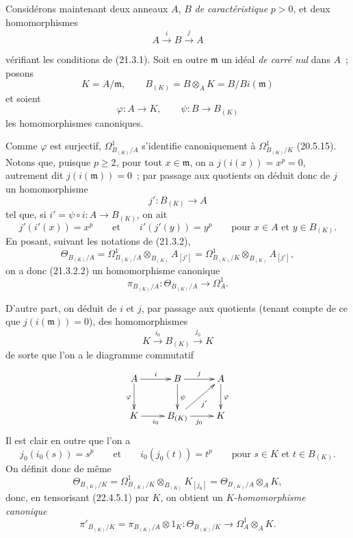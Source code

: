 \begin{env}[22.4.5]
\label{0.22.4.5-fr}
Considérons maintenant deux anneaux $A$, $B$ \emph{de caractéristique} $p>0$, et
deux homomorphismes
\[
  A\xrightarrow{i}B\xrightarrow{j}A
\]


vérifiant les conditions de (21.3.1). Soit en outre $\mathfrak m$ un idéal
\emph{de carré nul} dans $A$~; posons
\[
  K=A/\mathfrak m,\qquad
  B_{(K)}=B\otimes_AK=B/Bi(\mathfrak m)
\]
et soient
\[
  \varphi:A\longrightarrow K,\qquad
  \psi:B\longrightarrow B_{(K)}
\]
les homomorphismes canoniques.

Comme $\varphi$ est surjectif, $\Omega^1_{B_{(K)}/A}$ s'identifie
canoniquement à $\Omega^1_{B_{(K)}/K}$ (20.5.15). Notons que, puisque
$p\geqslant2$, pour tout $x\in\mathfrak m$, on a $j(i(x))=x^p=0$, autrement
dit $j(i(\mathfrak m))=0$~; par passage aux quotients on déduit donc de $j$ un
homomorphisme
\[
  j':B_{(K)}\longrightarrow A
\]
tel que, si $i'=\psi\circ i:A\longrightarrow B_{(K)}$, on ait
\[
  j'(i'(x))=x^p\qquad\text{et}\qquad i'(j'(y))=y^p
  \qquad\text{pour }x\in A\text{ et }y\in B_{(K)}.
\]
En posant, suivant les notations de (21.3.2),
\[
  \Theta_{B_{(K)}/A}
  =\Omega^1_{B_{(K)}/A}\otimes_{B_{(K)}}A_{[j']}
  =\Omega^1_{B_{(K)}/K}\otimes_{B_{(K)}}A_{[j']},
\]
on a donc (21.3.2.2) un homomorphisme canonique
\begin{equation}
\label{0.22.4.5.1-fr}
  \pi_{B_{(K)}/A}:\Theta_{B_{(K)}/A}\longrightarrow\Omega^1_A.
  \tag{22.4.5.1}
\end{equation}

D'autre part, on déduit de $i$ et $j$, par passage aux quotients (tenant compte
de ce que $j(i(\mathfrak m))=0$), des homomorphismes
\[
  K\xrightarrow{i_0}B_{(K)}\xrightarrow{j_0}K
\]
de sorte que l'on a le diagramme commutatif
\[
  \xymatrix{
    A \ar[r]^i \ar[d]_\varphi & B \ar[r]^j \ar[d]^\psi & A \ar[d]^\varphi \\
    K \ar[r]_{i_0} & B_{(K)} \ar[r]_{j_0} \ar[ur]_{j'} & K
  }
\]
Il est clair en outre que l'on a
\[
  j_0(i_0(s))=s^p\qquad\text{et}\qquad i_0(j_0(t))=t^p
  \qquad\text{pour }s\in K\text{ et }t\in B_{(K)}.
\]
On définit donc de même
\[
  \Theta_{B_{(K)}/K}
  =\Omega^1_{B_{(K)}/K}\otimes_{B_{(K)}}K_{[j_0]}
  =\Theta_{B_{(K)}/A}\otimes_AK,
\]
donc, en tensorisant (22.4.5.1) par $K$, on obtient un
$K$-\emph{homomorphisme canonique}
\begin{equation}
\label{0.22.4.5.2-fr}
  \pi'_{B_{(K)}/K}=\pi_{B_{(K)}/A}\otimes1_K:
  \Theta_{B_{(K)}/K}\longrightarrow\Omega^1_A\otimes_AK.
  \tag{22.4.5.2}
\end{equation}


\end{env}
